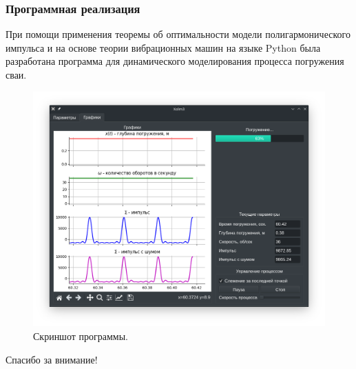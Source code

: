 \documentclass[10pt, pdf, hyperref={unicode}]{beamer}
\begin{document}
    \begin{frame}
        \frametitle{Программная реализация}
        \begin{center}
            \begin{minipage}[h]{0.97\linewidth}
                При помощи применения теоремы об оптимальности модели полигармонического импульса и на основе теории вибрационных машин
                на языке Python была разработана программа для динамического моделирования процесса погружения сваи.
                \begin{figure}[h]
                    \centering
                    \includegraphics[width=0.55\linewidth]{../img/xolm_3.png}
                    \caption{Скриншот программы.}
                \end{figure}
            \end{minipage}
        \end{center}
    \end{frame}


    \begin{frame}
        \begin{alertblock}{}
            \centerline{\large Спасибо за внимание!}
        \end{alertblock}
    \end{frame}
\end{document}
